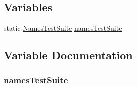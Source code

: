 \subsection*{Variables}
\begin{DoxyCompactItemize}
\item 
static \hyperlink{classNamesTestSuite}{Names\+Test\+Suite} \hyperlink{names-test-suite_8cc_a9072466d7cf9eb431fa954bbd08c082c}{names\+Test\+Suite}
\end{DoxyCompactItemize}


\subsection{Variable Documentation}
\subsubsection[{\texorpdfstring{names\+Test\+Suite}{namesTestSuite}}]{ names\+Test\+Suite\hspace{0.3cm}{\ttfamily [static]}}\hypertarget{names-test-suite_8cc_a9072466d7cf9eb431fa954bbd08c082c}{}\label{names-test-suite_8cc_a9072466d7cf9eb431fa954bbd08c082c}
